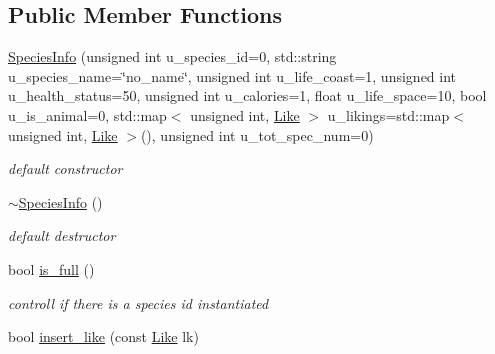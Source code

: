 \subsection*{Public Member Functions}
\begin{DoxyCompactItemize}
\item 
\hypertarget{structSpeciesInfo_a6745ba94ebb519cd684df916edf7aa68}{
\hyperlink{structSpeciesInfo_a6745ba94ebb519cd684df916edf7aa68}{SpeciesInfo} (unsigned int u\_\-species\_\-id=0, std::string u\_\-species\_\-name=\char`\"{}no\_\-name\char`\"{}, unsigned int u\_\-life\_\-coast=1, unsigned int u\_\-health\_\-status=50, unsigned int u\_\-calories=1, float u\_\-life\_\-space=10, bool u\_\-is\_\-animal=0, std::map$<$ unsigned int, \hyperlink{structLike}{Like} $>$ u\_\-likings=std::map$<$ unsigned int, \hyperlink{structLike}{Like} $>$(), unsigned int u\_\-tot\_\-spec\_\-num=0)}
\label{structSpeciesInfo_a6745ba94ebb519cd684df916edf7aa68}

\begin{DoxyCompactList}\small\item\em default constructor \end{DoxyCompactList}\item 
\hypertarget{structSpeciesInfo_a8dace9e28c3e6237fa1b7f894ff3b239}{
\hyperlink{structSpeciesInfo_a8dace9e28c3e6237fa1b7f894ff3b239}{$\sim$SpeciesInfo} ()}
\label{structSpeciesInfo_a8dace9e28c3e6237fa1b7f894ff3b239}

\begin{DoxyCompactList}\small\item\em default destructor \end{DoxyCompactList}\item 
\hypertarget{structSpeciesInfo_a3d012834e84c8d878436a739f141f154}{
bool \hyperlink{structSpeciesInfo_a3d012834e84c8d878436a739f141f154}{is\_\-full} ()}
\label{structSpeciesInfo_a3d012834e84c8d878436a739f141f154}

\begin{DoxyCompactList}\small\item\em controll if there is a species id instantiated \end{DoxyCompactList}\item 
\hypertarget{structSpeciesInfo_a2d1e5213bc29602ac60cde0e5e5f3b00}{
bool \hyperlink{structSpeciesInfo_a2d1e5213bc29602ac60cde0e5e5f3b00}{insert\_\-like} (const \hyperlink{structLike}{Like} lk)}
\label{structSpeciesInfo_a2d1e5213bc29602ac60cde0e5e5f3b00}


\end{DoxyCompactItemize}
